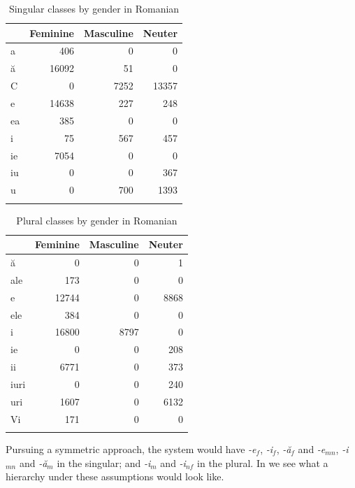 \begin{table}
  \centering
  \begin{tabular}{lrrr}
    \lsptoprule
    & Feminine & Masculine & Neuter \\
    \midrule
    a  & 406     & 0        & 0      \\
    ă  & 16092   & 51       & 0      \\
    C  & 0       & 7252     & 13357  \\
    e  & 14638   & 227      & 248    \\
    ea & 385     & 0        & 0      \\
    i  & 75      & 567      & 457    \\
    ie & 7054    & 0        & 0      \\
    iu & 0       & 0        & 367    \\
    u  & 0       & 700      & 1393   \\
    \lspbottomrule
  \end{tabular}
  \caption{Singular classes by gender in Romanian}\label{tab:sing-rom-gender}
\end{table}

\begin{table}
  \centering
  \begin{tabular}{lrrr}
    \lsptoprule
    & Feminine & Masculine & Neuter \\
    \midrule
    ă    & 0       & 0        & 1      \\
    ale  & 173     & 0        & 0      \\
    e    & 12744   & 0        & 8868   \\
    ele  & 384     & 0        & 0      \\
    i    & 16800   & 8797     & 0      \\
    ie   & 0       & 0        & 208    \\
    ii   & 6771    & 0        & 373    \\
    iuri & 0       & 0        & 240    \\
    uri  & 1607    & 0        & 6132   \\
    Vi   & 171     & 0        & 0      \\
    \lspbottomrule
  \end{tabular}
  \caption{Plural classes by gender in Romanian}\label{tab:plur-rom-gender}
\end{table}

Pursuing a symmetric approach, the system would have \textit{-e}$_{f}$, \textit{-i}$_{f}$, \textit{-ă}$_{f}$ and \textit{-e}$_{mn}$, \textit{-i}$_{mn}$ and \textit{-ă}$_{m}$ in the singular; and \textit{-i}$_{m}$ and \textit{-i}$_{nf}$ in the plural. In   we see what a hierarchy under these assumptions would look like.


